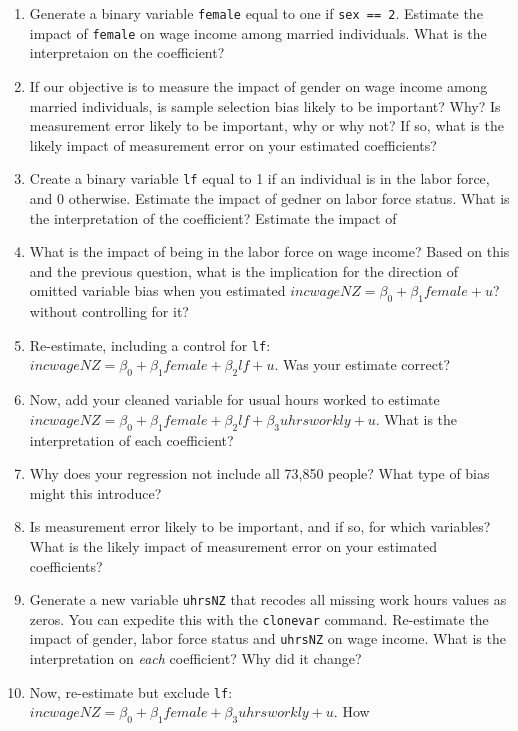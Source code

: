 \documentclass[11pt]{article}
\begin{document}
\begin{enumerate}
\def\labelenumi{\arabic{enumi}.}
\setcounter{enumi}{3}
\item
  Generate a binary variable \texttt{female} equal to one if
  \texttt{sex\ ==\ 2}. Estimate the impact of \texttt{female} on wage
  income among married individuals. What is the interpretaion on the
  coefficient?
\item
  If our objective is to measure the impact of gender on wage income
  among married individuals, is sample selection bias likely to be
  important? Why? Is measurement error likely to be important, why or
  why not? If so, what is the likely impact of measurement error on your
  estimated coefficients?
\item
  Create a binary variable \texttt{lf} equal to 1 if an individual is in
  the labor force, and 0 otherwise. Estimate the impact of gedner on
  labor force status. What is the interpretation of the coefficient?
  Estimate the impact of
\item
  What is the impact of being in the labor force on wage income? Based
  on this and the previous question, what is the implication for the
  direction of omitted variable bias when you estimated
  \(incwageNZ = \beta_0 + \beta_1 female + u\)? without controlling for
  it?
\item
  Re-estimate, including a control for \texttt{lf}:
  \(incwageNZ = \beta_0 + \beta_1 female + \beta_2 lf + u\). Was your
  estimate correct?
\item
  Now, add your cleaned variable for usual hours worked to estimate
  \(incwageNZ = \beta_0 + \beta_1 female + \beta_2 lf + \beta_3 uhrsworkly + u\).
  What is the interpretation of each coefficient?
\item
  Why does your regression not include all 73,850 people? What type of
  bias might this introduce?
\item
  Is measurement error likely to be important, and if so, for which
  variables? What is the likely impact of measurement error on your
  estimated coefficients?
\item
  Generate a new variable \texttt{uhrsNZ} that recodes all missing work
  hours values as zeros. You can expedite this with the
  \texttt{clonevar} command. Re-estimate the impact of gender, labor
  force status and \texttt{uhrsNZ} on wage income. What is the
  interpretation on \emph{each} coefficient? Why did it change?
\item
  Now, re-estimate but exclude \texttt{lf}:
  \(incwageNZ = \beta_0 + \beta_1 female + \beta_3 uhrsworkly + u\). How

\end{enumerate}
\end{document}
